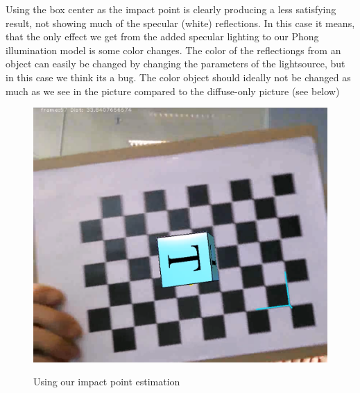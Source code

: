 Using the box center as the impact point is clearly producing a less satisfying result, not showing much of the specular (white) reflections. In this case it means, that the only effect we get from the added specular lighting to our Phong illumination model is some color changes. The color of the reflectiongs from an object can easily be changed by changing the parameters of the lightsource, but in this case we think its a bug. The color object should ideally not be changed as much as we see in the picture compared to the diffuse-only picture (see below)

\begin{figure}[!htbp]
    \includegraphics{pics/EstimatedLight.png}
    \label{fig:EstimatedImpactPoint}
    \caption{Using our impact point estimation}
\end{figure}

